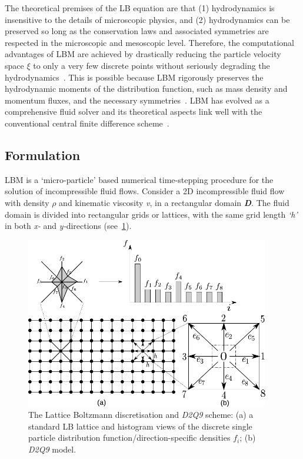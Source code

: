 The theoretical premises of the LB equation are that (1) hydrodynamics is 
insensitive to the details of microscopic physics, and (2) hydrodynamics can be 
preserved so long as the conservation laws and associated symmetries are 
respected in the microscopic and mesoscopic level. Therefore, the computational 
advantages of LBM are achieved by drastically reducing the particle velocity 
space $\xi$ to only a very few discrete points without seriously degrading the
hydrodynamics~\citep{Mei2000}. This is possible because LBM rigorously 
preserves the hydrodynamic moments of the distribution function, such as mass 
density and momentum fluxes, and the necessary 
symmetries~\citep{He1997a,He1997b}.
LBM has evolved as a comprehensive fluid solver and its theoretical aspects 
link well with the conventional central finite difference 
scheme~\citep{Cook2004}.

\subsection{Formulation}

LBM is a `micro-particle' based numerical time-stepping procedure for the 
solution of incompressible fluid flows. Consider a 2D incompressible fluid flow 
with density $\rho$ and kinematic viscosity \textit{v}, in a rectangular domain 
\textit{\textbf{D}}. The fluid domain is divided into rectangular grids or 
lattices, with the same grid length \textit{`h'} in both \textit{x-} and 
\textit{y-}directions (see~\cref{fig:D2Q9}). 
\begin{figure}[htpb]
	\centering
	\includegraphics[width=0.95\textwidth]{D2Q9}
	\caption[The lattice Boltzmann discretisation and \textit{D2Q9} 
	scheme.]{The Lattice 
	Boltzmann discretisation and \textit{D2Q9} scheme: (a) a standard LB 
	lattice and 
	histogram views of the discrete single particle distribution 
	function/direction-specific densities $f_i$; (b) \textit{D2Q9} model.}
	\label{fig:D2Q9}
\end{figure}

